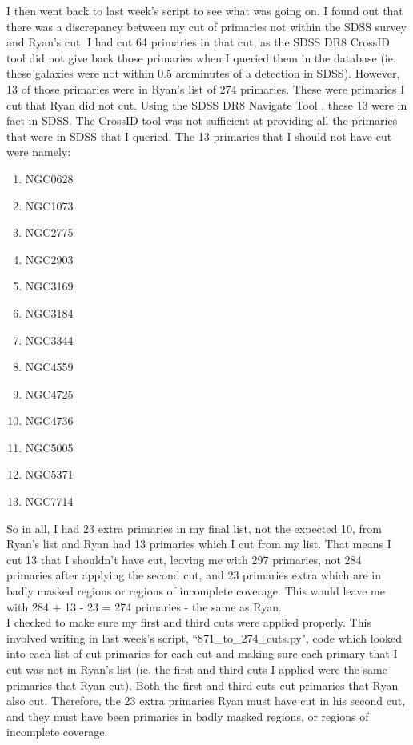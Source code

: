 \documentclass[10pt,letterpaper]{article}
\begin{document}
I then went back to last week's script to see what was going on. I found out that there was a discrepancy between my cut of primaries not within the SDSS survey and Ryan's cut. I had cut 64 primaries in that cut, as the SDSS DR8 CrossID tool did not give back those primaries when I queried them in the database (ie. these galaxies were not within 0.5 arcminutes of a detection in SDSS). However, 13 of those primaries were in Ryan's list of 274 primaries. These were primaries I cut that Ryan did not cut. Using the SDSS DR8 Navigate Tool \cite{navigate}, these 13 were in fact in SDSS. The CrossID tool was not sufficient at providing all the primaries that were in SDSS that I queried. The 13 primaries that I should not have cut were namely:\\

\begin{enumerate}
\item NGC0628
\item NGC1073
\item NGC2775
\item NGC2903
\item NGC3169
\item NGC3184
\item NGC3344
\item NGC4559
\item NGC4725
\item NGC4736
\item NGC5005
\item NGC5371
\item NGC7714
\end{enumerate}

So in all, I had 23 extra primaries in my final list, not the expected 10, from Ryan's list and Ryan had 13 primaries which I cut from my list. That means I cut 13 that I shouldn't have cut, leaving me with 297 primaries, not 284 primaries after applying the second cut, and 23 primaries extra which are in badly masked regions or regions of incomplete coverage. This would leave me with 284 + 13 - 23 = 274 primaries - the same as Ryan.\\

I checked to make sure my first and third cuts were applied properly. This involved writing in last week's script, ``871\_to\_274\_cuts.py", code which looked into each list of cut primaries for each cut and making sure each primary that I cut was not in Ryan's list (ie. the first and third cuts I applied were the same primaries that Ryan cut). Both the first and third cuts cut primaries that Ryan also cut. Therefore, the 23 extra primaries Ryan must have cut in his second cut, and they must have been primaries in badly masked regions, or regions of incomplete coverage.\\
\end{document}
